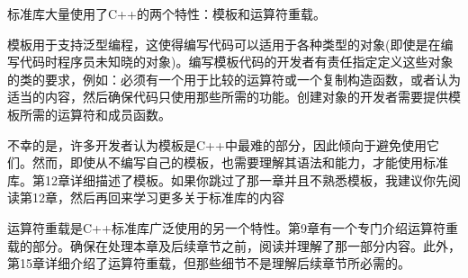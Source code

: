 
标准库大量使用了C++的两个特性：模板和运算符重载。


模板用于支持泛型编程，这使得编写代码可以适用于各种类型的对象(即使是在编写代码时程序员未知晓的对象)。编写模板代码的开发者有责任指定定义这些对象的类的要求，例如：必须有一个用于比较的运算符或一个复制构造函数，或者认为适当的内容，然后确保代码只使用那些所需的功能。创建对象的开发者需要提供模板所需的运算符和成员函数。

不幸的是，许多开发者认为模板是C++中最难的部分，因此倾向于避免使用它们。然而，即使从不编写自己的模板，也需要理解其语法和能力，才能使用标准库。第12章详细描述了模板。如果你跳过了那一章并且不熟悉模板，我建议你先阅读第12章，然后再回来学习更多关于标准库的内容


运算符重载是C++标准库广泛使用的另一个特性。第9章有一个专门介绍运算符重载的部分。确保在处理本章及后续章节之前，阅读并理解了那一部分内容。此外，第15章详细介绍了运算符重载，但那些细节不是理解后续章节所必需的。
